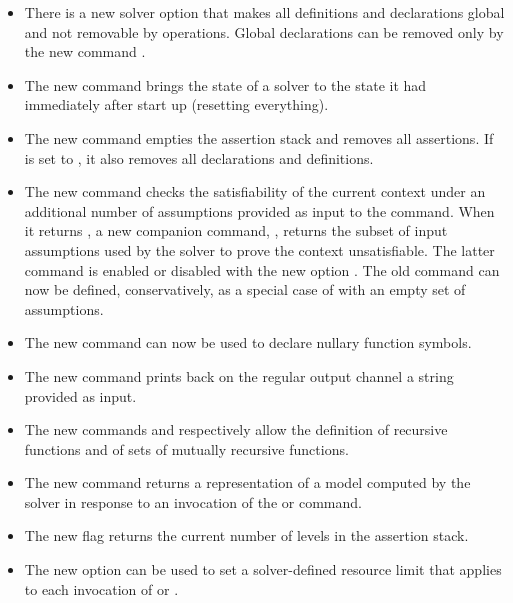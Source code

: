 \begin{itemize}
\item
There is a new solver option  
that makes all definitions and declarations global and 
not removable by  operations.
Global declarations can be removed only 
by the new command .

\item
The new command  brings the state of a solver
to the state it had immediately after start up (resetting everything).

\item
The new command  empties the assertion stack
and removes all assertions.
If  is set to , it also removes 
all declarations and definitions.

\item
The new command  checks the satisfiability 
of the current context under an additional number of assumptions provided 
as input to the command.
When it returns , a new companion command, 
, returns the subset of input assumptions
used by the solver to prove the context unsatisfiable. 
The latter command is enabled or disabled with the new option 
.
The old  command can now be defined, conservatively,
as a special case of  with an empty set of assumptions.

\item
The new command  can now be used to declare 
nullary function symbols.

\item
The new command  prints back on the regular output channel
a string provided as input.

\item
The new commands  and  respectively
allow the definition of recursive functions and of sets of mutually recursive
functions.

\item
The new command  returns a representation of a model computed
by the solver in response to an invocation of the  or 
 command.

\item
The new  flag  returns 
the current number of levels in the assertion stack.

\item
The new option  can be used to set 
a solver-defined resource limit that applies to each invocation of 
 or .

\end{itemize}





